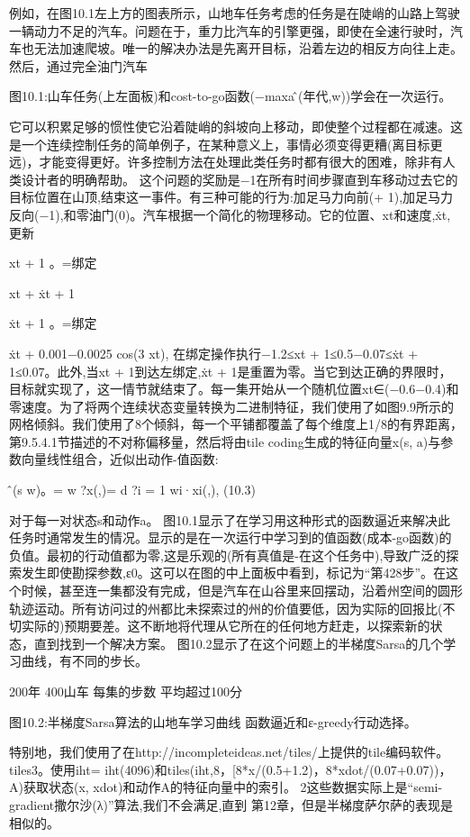 例如，在图10.1左上方的图表所示，山地车任务考虑的任务是在陡峭的山路上驾驶一辆动力不足的汽车。问题在于，重力比汽车的引擎更强，即使在全速行驶时，汽车也无法加速爬坡。唯一的解决办法是先离开目标，沿着左边的相反方向往上走。然后，通过完全油门汽车
 

图10.1:山车任务(上左面板)和cost-to-go函数(−maxa问̂(年代,w))学会在一次运行。



它可以积累足够的惯性使它沿着陡峭的斜坡向上移动，即使整个过程都在减速。这是一个连续控制任务的简单例子，在某种意义上，事情必须变得更糟(离目标更远)，才能变得更好。许多控制方法在处理此类任务时都有很大的困难，除非有人类设计者的明确帮助。
这个问题的奖励是−1在所有时间步骤直到车移动过去它的目标位置在山顶,结束这一事件。有三种可能的行为:加足马力向前(+ 1),加足马力反向(−1),和零油门(0)。汽车根据一个简化的物理移动。它的位置、xt和速度,ẋt,更新


xt + 1
。=绑定

xt + ẋt + 1


ẋt + 1
。=绑定

ẋt + 0.001−0.0025 cos(3 xt),
在绑定操作执行−1.2≤xt + 1≤0.5−0.07≤ẋt + 1≤0.07。此外,当xt + 1到达左绑定,ẋt + 1是重置为零。当它到达正确的界限时，目标就实现了，这一情节就结束了。每一集开始从一个随机位置xt∈(−0.6−0.4)和零速度。为了将两个连续状态变量转换为二进制特征，我们使用了如图9.9所示的网格倾斜。我们使用了8个倾斜，每一个平铺都覆盖了每个维度上1/8的有界距离，
第9.5.4.1节描述的不对称偏移量，然后将由tile coding生成的特征向量x(s, a)与参数向量线性组合，近似出动作-值函数:


问̂(s w)。= w ?x(,)=
d ?i = 1
wi·xi(,), 					(10.3)

对于每一对状态s和动作a。
图10.1显示了在学习用这种形式的函数逼近来解决此任务时通常发生的情况。显示的是在一次运行中学习到的值函数(成本-go函数)的负值。最初的行动值都为零,这是乐观的(所有真值是-在这个任务中),导致广泛的探索发生即使勘探参数,ε0。这可以在图的中上面板中看到，标记为“第428步”。在这个时候，甚至连一集都没有完成，但是汽车在山谷里来回摆动，沿着州空间的圆形轨迹运动。所有访问过的州都比未探索过的州的价值要低，因为实际的回报比(不切实际的)预期要差。这不断地将代理从它所在的任何地方赶走，以探索新的状态，直到找到一个解决方案。
图10.2显示了在这个问题上的半梯度Sarsa的几个学习曲线，有不同的步长。
 
200年
400山车
每集的步数
平均超过100分
 


图10.2:半梯度Sarsa算法的山地车学习曲线
函数逼近和ε-greedy行动选择。




特别地，我们使用了在http://incompleteideas.net/tiles/上提供的tile编码软件。
tiles3。使用iht= iht(4096)和tiles(iht,8，[8*x/(0.5+1.2)，8*xdot/(0.07+0.07))， A)获取状态(x, xdot)和动作A的特征向量中的索引。
2这些数据实际上是“semi-gradient撒尔沙(λ)”算法,我们不会满足,直到
第12章，但是半梯度萨尔萨的表现是相似的。


